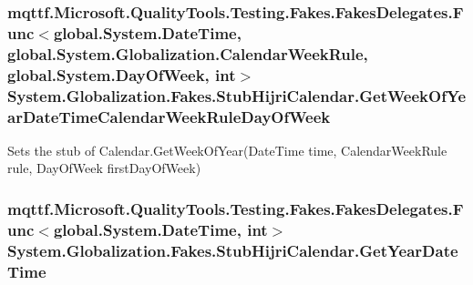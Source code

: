 \hypertarget{class_system_1_1_globalization_1_1_fakes_1_1_stub_hijri_calendar_a2c01dec10f24678568a180ce995d7b8c}{
\subsubsection[{Get\-Week\-Of\-Year\-Date\-Time\-Calendar\-Week\-Rule\-Day\-Of\-Week}]{\setlength{\rightskip}{0pt plus 5cm}mqttf.\-Microsoft.\-Quality\-Tools.\-Testing.\-Fakes.\-Fakes\-Delegates.\-Func$<$global.\-System.\-Date\-Time, global.\-System.\-Globalization.\-Calendar\-Week\-Rule, global.\-System.\-Day\-Of\-Week, int$>$ System.\-Globalization.\-Fakes.\-Stub\-Hijri\-Calendar.\-Get\-Week\-Of\-Year\-Date\-Time\-Calendar\-Week\-Rule\-Day\-Of\-Week}}\label{class_system_1_1_globalization_1_1_fakes_1_1_stub_hijri_calendar_a2c01dec10f24678568a180ce995d7b8c}


Sets the stub of Calendar.\-Get\-Week\-Of\-Year(\-Date\-Time time, Calendar\-Week\-Rule rule, Day\-Of\-Week first\-Day\-Of\-Week)

\hypertarget{class_system_1_1_globalization_1_1_fakes_1_1_stub_hijri_calendar_a1ad2b061ae2eb559aa563aaac04d6aa9}{
\subsubsection[{Get\-Year\-Date\-Time}]{\setlength{\rightskip}{0pt plus 5cm}mqttf.\-Microsoft.\-Quality\-Tools.\-Testing.\-Fakes.\-Fakes\-Delegates.\-Func$<$global.\-System.\-Date\-Time, int$>$ System.\-Globalization.\-Fakes.\-Stub\-Hijri\-Calendar.\-Get\-Year\-Date\-Time}}\label{class_system_1_1_globalization_1_1_fakes_1_1_stub_hijri_calendar_a1ad2b061ae2eb559aa563aaac04d6aa9}



